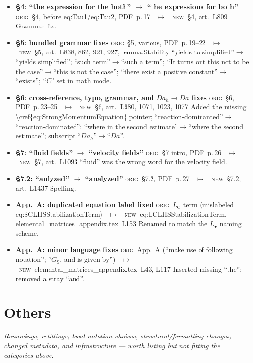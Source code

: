 \documentclass[11pt]{article}
\newcommand{\Orig}{\textcolor{origc}{\footnotesize\textsc{orig}}}
\newcommand{\New}{\textcolor{newc}{\footnotesize\textsc{new}}}
\newcommand{\code}[1]{\textcolor{newc}{\ttfamily\small #1}}
\newcommand{\pdfp}[1]{PDF~p.\,#1}
\newcommand{\artl}[1]{art.\ L#1}       %
\newcommand{\appl}[2]{#1~L#2}          %
\newcommand{\ch}[4]{%
  \item \textbf{#1}\newline
    {\footnotesize\Orig\ #2 \ \textcolor{locc}{$\longmapsto$} \ \New\ #3}\newline
    #4}
\begin{document}
\begin{itemize}
\ch{\S4: ``the expression for the both'' $\to$ ``the expressions for both''}
   {\S4, before \code{eq:Tau1}/\code{eq:Tau2}, \pdfp{17}}{\S4, \artl{809}}{Grammar fix.}
\ch{\S5: bundled grammar fixes}
   {\S5, various, \pdfp{19}--22}{\S5, \artl{838}, 862, 921, 927, \code{lemma:Stability}}
   {``yields to simplified''$\to$``yields simplified''; ``such term''$\to$``such a term''; ``It turns
    out this not to be the case''$\to$``this is not the case''; ``there exist a positive
    constant''$\to$``exists''; ``$C$'' set in math mode.}
\ch{\S6: cross-reference, typo, grammar, and $Da_h\!\to\!Da$ fixes}
   {\S6, \pdfp{23}--25}{\S6, \artl{980}, 1071, 1023, 1077}
   {Added the missing \code{\textbackslash cref\{eq:StrongMomentumEquation\}} pointer;
    ``reaction-dominanted''$\to$``reaction-dominated''; ``where in the second estimate''$\to$``where the
    second estimate''; subscript ``$Da_h$''$\to$``$Da$''.}
\ch{\S7: ``fluid fields'' $\to$ ``velocity fields''}
   {\S7 intro, \pdfp{26}}{\S7, \artl{1093}}{``fluid'' was the wrong word for the velocity field.}
\ch{\S7.2: ``anlyzed'' $\to$ ``analyzed''}
   {\S7.2, \pdfp{27}}{\S7.2, \artl{1437}}{Spelling.}
\ch{App.~A: duplicated equation label fixed}
   {$L_{\mathrm C}$ term (mislabeled \code{eq:SCLHSStabilizationTerm})}
   {\code{eq:LCLHSStabilizationTerm}, \appl{elemental\_matrices\_appendix.tex}{153}}
   {Renamed to match the $L_\bullet$ naming scheme.}
\ch{App.~A: minor language fixes}
   {App.~A (``make use of following notation''; ``$G_{\mathrm S}$, and is given by'')}
   {\appl{elemental\_matrices\_appendix.tex}{43}, L117}
   {Inserted missing ``the''; removed a stray ``and''.}
\end{itemize}

\section{Others}
\emph{Renamings, retitlings, local notation choices, structural/formatting changes, changed
metadata, and infrastructure --- worth listing but not fitting the categories above.}
\end{document}
